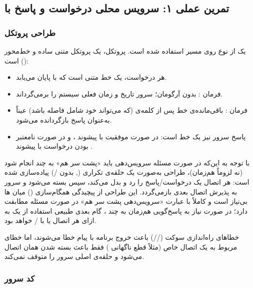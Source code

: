 \subsection{تمرین عملی ۱: سرویس محلی درخواست و پاسخ با }

\subsubsection*{طراحی پروتکل}

یک  از نوع  روی مسیر  استفاده شده است. پروتکل، یک پروتکل متنی ساده و خط‌محور () است:

\begin{itemize}
	\item هر درخواست، یک خط متنی است که با  پایان می‌یابد.
	\item فرمان : بدون آرگومان؛ سرور تاریخ و زمان فعلی سیستم را برمی‌گرداند.
	\item فرمان : باقی‌مانده‌ی خط پس از کلمه‌ی  (که می‌تواند خود شامل فاصله باشد) عیناً به‌عنوان پاسخ بازگردانده می‌شود.
	\item پاسخ سرور نیز یک خط است: در صورت موفقیت با پیشوند ، و در صورت نامعتبر بودن درخواست با پیشوند .
\end{itemize}

با توجه به این‌که در صورت مسئله سرویس‌دهی باید «پشت سر هم» به چند  انجام شود (نه لزوماً هم‌زمان)، طراحی به‌صورت یک حلقه‌ی  تکراری (, بدون /) پیاده‌سازی شده است: هر اتصال یک درخواست/پاسخ را رد و بدل می‌کند، سپس بسته می‌شود و سرور به پذیرش اتصال بعدی بازمی‌گردد. این طراحی از پیچیدگی همگام‌سازی () میان ها بی‌نیاز است و کاملاً با عبارت «سرویس‌دهی پشت سر هم» در صورت مسئله مطابقت دارد؛ در صورت نیاز به پاسخ‌گویی هم‌زمان به چند ، گام بعدی طبیعی استفاده از یک  به ازای هر اتصال یا  با / خواهد بود.

خطاهای راه‌اندازی سوکت (//) باعث خروج برنامه با پیام خطا می‌شوند، اما خطای مربوط به یک اتصال خاص (مثلاً قطع ناگهانی ) فقط باعث بسته شدن همان اتصال می‌شود و حلقه‌ی اصلی سرور را متوقف نمی‌کند.

\subsubsection*{کد سرور}

